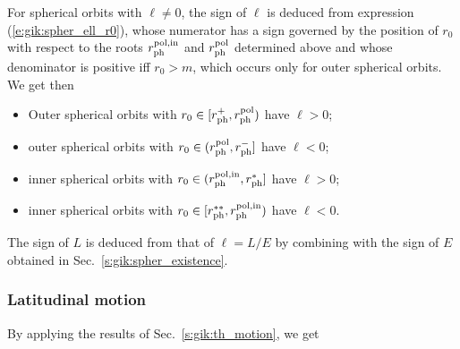 For spherical orbits with $\ell\neq 0$,
the sign of $\ell$ is deduced from expression (\ref{e:gik:spher_ell_r0}),
whose numerator has a sign governed by the position of $r_0$ with respect to the
roots $r_{\rm ph}^{\rm pol,in}$ and $r_{\rm ph}^{\rm pol}$ determined above and whose denominator is positive iff $r_0 > m$, which occurs
only for outer spherical orbits. We get then
\begin{greybox}
\begin{itemize}
\item Outer spherical orbits with $r_0 \in [r_{\rm ph}^+, r_{\rm ph}^{\rm pol})$ %
have $\ell > 0$;
\item outer spherical orbits with $r_0 \in (r_{\rm ph}^{\rm pol}, r_{\rm ph}^-]$ %
have $\ell < 0$;
\item inner spherical orbits with $r_0 \in (r_{\rm ph}^{\rm pol,in}, r_{\rm ph}^*]$
have $\ell > 0$;
\item inner spherical orbits with $r_0 \in [r_{\rm ph}^{**}, r_{\rm ph}^{\rm pol,in})$ %
have $\ell < 0$.
\end{itemize}
\end{greybox}
The sign of $L$ is deduced from that of $\ell = L/E$ by combining with the sign of $E$ obtained
in Sec.~\ref{s:gik:spher_existence}.

\subsubsection{Latitudinal motion}

By applying the results of Sec.~\ref{s:gik:th_motion}, we get

